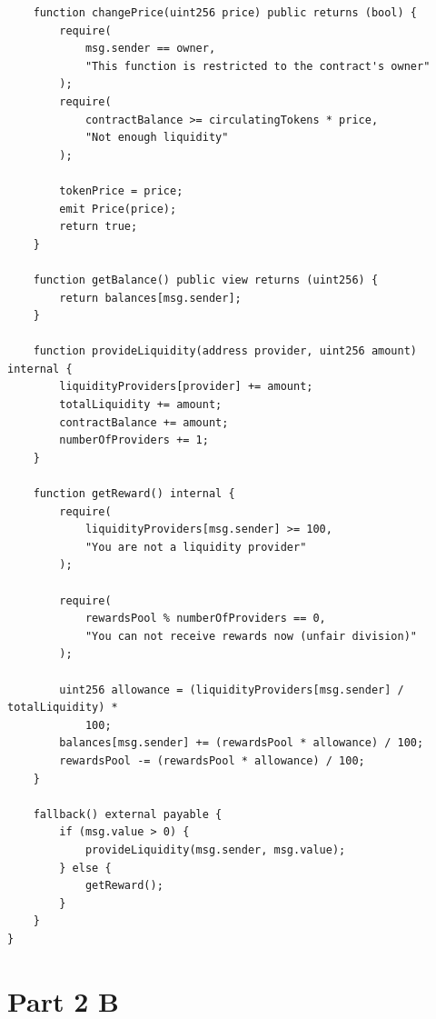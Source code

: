 \documentclass[12pt,a4paper]{article}
\begin{document}
\begin{lstlisting}
    function changePrice(uint256 price) public returns (bool) {
        require(
            msg.sender == owner,
            "This function is restricted to the contract's owner"
        );
        require(
            contractBalance >= circulatingTokens * price,
            "Not enough liquidity"
        );

        tokenPrice = price;
        emit Price(price);
        return true;
    }

    function getBalance() public view returns (uint256) {
        return balances[msg.sender];
    }

    function provideLiquidity(address provider, uint256 amount) internal {
        liquidityProviders[provider] += amount;
        totalLiquidity += amount;
        contractBalance += amount;
        numberOfProviders += 1;
    }

    function getReward() internal {
        require(
            liquidityProviders[msg.sender] >= 100,
            "You are not a liquidity provider"
        );

        require(
            rewardsPool % numberOfProviders == 0,
            "You can not receive rewards now (unfair division)"
        );

        uint256 allowance = (liquidityProviders[msg.sender] / totalLiquidity) *
            100;
        balances[msg.sender] += (rewardsPool * allowance) / 100;
        rewardsPool -= (rewardsPool * allowance) / 100;
    }

    fallback() external payable {
        if (msg.value > 0) {
            provideLiquidity(msg.sender, msg.value);
        } else {
            getReward();
        }
    }
}
\end{lstlisting}

\section*{Part 2 B}
\end{document}
